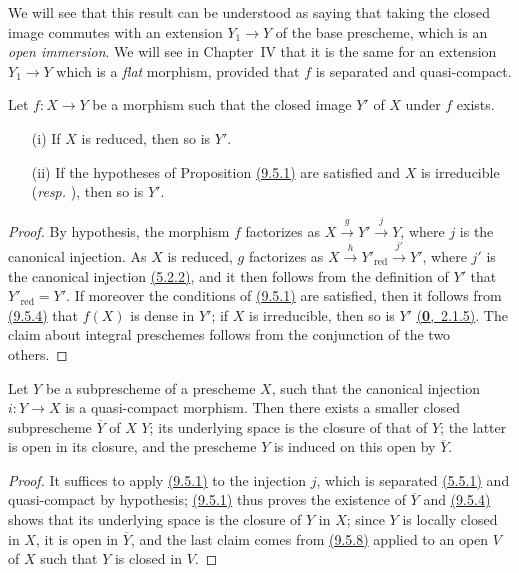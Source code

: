 We will see that this result can be understood as saying that taking the closed image commutes with an extension $Y_1\to Y$ of the base prescheme, which is an {\em open immersion}.
We will see in Chapter~IV that it is the same for an extension $Y_1\to Y$ which is a {\em flat} morphism, provided that $f$ is separated and quasi-compact.

\begin{prop}[9.5.9]
\label{prop-1.9.5.9}
Let $f:X\to Y$ be a morphism such that the closed image $Y'$ of $X$ under $f$ exists.
\begin{itemize}
  \item[{\rm(i)}] If $X$ is reduced, then so is $Y'$.
  \item[{\rm(ii)}] If the hypotheses of Proposition \hyperref[prop-1.9.5.1]{(9.5.1)} are satisfied and $X$ is irreducible ({\em resp.} ), then so is $Y'$.
\end{itemize}
\end{prop}

\begin{proof}
\label{proof-prop-1.9.5.9}
By hypothesis, the morphism $f$ factorizes as $X\xrightarrow{g}Y'\xrightarrow{j}Y$, where $j$ is the canonical injection.
As $X$ is reduced, $g$ factorizes as $X\xrightarrow{h}Y'_\mathrm{red}\xrightarrow{j'}Y'$, where $j'$ is the canonical injection \hyperref[prop-1.5.2.2]{(5.2.2)}, and it then follows from the definition of $Y'$ that $Y'_\mathrm{red}=Y'$.
If moreover the conditions of \hyperref[prop-1.5.9.1]{(9.5.1)} are satisfied, then it follows from \hyperref[prop-1.9.5.4]{(9.5.4)} that $f(X)$ is dense in $Y'$; if $X$ is irreducible, then so is $Y'$ \hyperref[env-0.2.1.5]{(\textbf{0},~2.1.5)}.
The claim about integral preschemes follows from the conjunction of the two others.
\end{proof}

\begin{prop}[9.5.10]
\label{prop-1.9.5.10}
Let $Y$ be a subprescheme of a prescheme $X$, such that the canonical injection $i:Y\to X$ is a quasi-compact morphism.
Then there exists a smaller closed subprescheme $\overline{Y}$ of $X$  $Y$; its underlying space is the closure of that of $Y$; the latter is open in its closure, and the prescheme $Y$ is induced on this open by $\overline{Y}$.
\end{prop}

\begin{proof}
\label{proof-prop-1.9.5.10}
It suffices to apply \hyperref[prop-1.5.9.1]{(9.5.1)} to the injection $j$, which is separated \hyperref[prop-1.5.5.1]{(5.5.1)} and quasi-compact by hypothesis; \hyperref[prop-1.5.9.1]{(9.5.1)} thus proves the existence of $\overline{Y}$ and \hyperref[prop-1.5.9.4]{(9.5.4)} shows that its underlying space is the closure of $Y$ in $X$; since $Y$ is locally closed in $X$, it is open in $\overline{Y}$, and the last claim comes from \hyperref[prop-1.5.9.8]{(9.5.8)} applied to an open $V$ of $X$ such that $Y$ is closed in $V$.
\end{proof}


